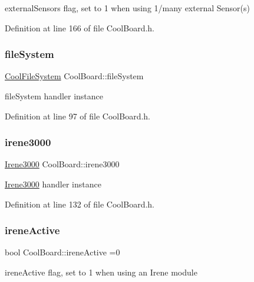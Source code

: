 external\+Sensors flag, set to 1 when using 1/many external Sensor(s) 

Definition at line 166 of file Cool\+Board.\+h.

\mbox{\label{class_cool_board_a42c2586fbb13ff7f06538e9284e8538d}} 
\subsubsection{\texorpdfstring{file\+System}{fileSystem}}
{\footnotesize\ttfamily \hyperlink{class_cool_file_system}{Cool\+File\+System} Cool\+Board\+::file\+System\hspace{0.3cm}{\ttfamily [private]}}

file\+System handler instance 

Definition at line 97 of file Cool\+Board.\+h.

\mbox{\label{class_cool_board_ad103718ce316006c4695b8eb312eaf11}} 
\subsubsection{\texorpdfstring{irene3000}{irene3000}}
{\footnotesize\ttfamily \hyperlink{class_irene3000}{Irene3000} Cool\+Board\+::irene3000\hspace{0.3cm}{\ttfamily [private]}}

\hyperlink{class_irene3000}{Irene3000} handler instance 

Definition at line 132 of file Cool\+Board.\+h.

\mbox{\label{class_cool_board_a9c3f7ac625481ee2ae802a25d97a4ae0}} 
\subsubsection{\texorpdfstring{irene\+Active}{ireneActive}}
{\footnotesize\ttfamily bool Cool\+Board\+::irene\+Active =0\hspace{0.3cm}{\ttfamily [private]}}

irene\+Active flag, set to 1 when using an Irene module 

